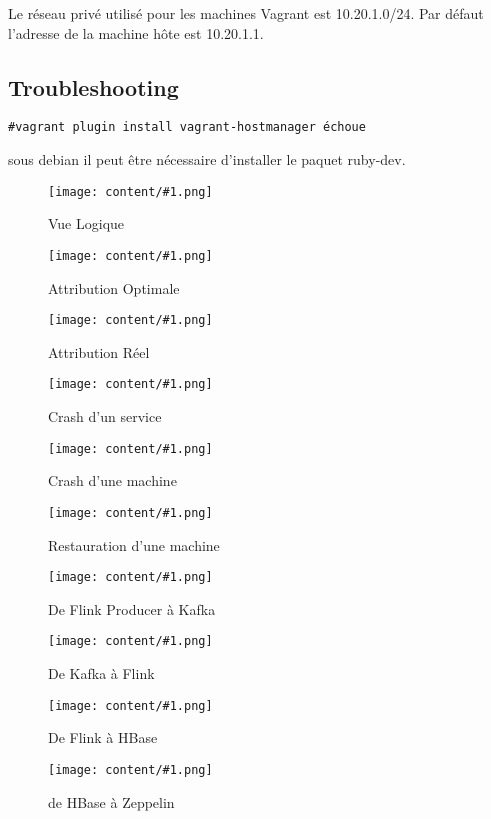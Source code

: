 \documentclass[a4paper,oneside,12pt]{article}
\newcommand\appendixpicture[3]{
	\begin{figure}[h]
	\centering
	\texttt{[image: content/\#1.png]}
	\caption{#2}
	\label{#1}
	\end{figure}
}
\begin{document}
Le réseau privé utilisé pour les machines Vagrant est 10.20.1.0/24. Par défaut l'adresse de la machine hôte est 10.20.1.1.

\subsection{Troubleshooting}

\verb!#vagrant plugin install vagrant-hostmanager échoue!

sous debian il peut être nécessaire d'installer le paquet ruby-dev.

\appendix

\appendixpicture{vuelogique}{Vue Logique}{15}
\appendixpicture{archioptimal}{Attribution Optimale}{15}
\appendixpicture{archireel}{Attribution Réel}{15}
\appendixpicture{archicrashservice}{Crash d'un service}{15}
\appendixpicture{archicrashmachine}{Crash d'une machine}{15}
\appendixpicture{archicomeback}{Restauration d'une machine}{15}

\appendixpicture{flinkkafka}{De Flink Producer à Kafka}{15}
\appendixpicture{kafkaflink}{De Kafka à Flink}{15}
\appendixpicture{flinkhbase}{De Flink à HBase}{15}
\appendixpicture{hbasezeppelin}{de HBase à Zeppelin}{15}
\end{document}
